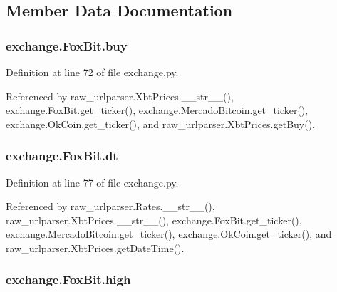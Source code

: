 \subsection{Member Data Documentation}
\hypertarget{classexchange_1_1_fox_bit_acb7e709cc05e8314b1bdacd32e4dfc80}{
\subsubsection[{buy}]{\setlength{\rightskip}{0pt plus 5cm}exchange.\-Fox\-Bit.\-buy}}\label{classexchange_1_1_fox_bit_acb7e709cc05e8314b1bdacd32e4dfc80}


Definition at line 72 of file exchange.\-py.



Referenced by raw\-\_\-urlparser.\-Xbt\-Prices.\-\_\-\-\_\-str\-\_\-\-\_\-(), exchange.\-Fox\-Bit.\-get\-\_\-ticker(), exchange.\-Mercado\-Bitcoin.\-get\-\_\-ticker(), exchange.\-Ok\-Coin.\-get\-\_\-ticker(), and raw\-\_\-urlparser.\-Xbt\-Prices.\-get\-Buy().

\hypertarget{classexchange_1_1_fox_bit_a363f8488eb0423f88519c085ae6f168f}{
\subsubsection[{dt}]{\setlength{\rightskip}{0pt plus 5cm}exchange.\-Fox\-Bit.\-dt}}\label{classexchange_1_1_fox_bit_a363f8488eb0423f88519c085ae6f168f}


Definition at line 77 of file exchange.\-py.



Referenced by raw\-\_\-urlparser.\-Rates.\-\_\-\-\_\-str\-\_\-\-\_\-(), raw\-\_\-urlparser.\-Xbt\-Prices.\-\_\-\-\_\-str\-\_\-\-\_\-(), exchange.\-Fox\-Bit.\-get\-\_\-ticker(), exchange.\-Mercado\-Bitcoin.\-get\-\_\-ticker(), exchange.\-Ok\-Coin.\-get\-\_\-ticker(), and raw\-\_\-urlparser.\-Xbt\-Prices.\-get\-Date\-Time().

\hypertarget{classexchange_1_1_fox_bit_a4f6dfaecbcc17ceadddf52d266d9c00d}{
\subsubsection[{high}]{\setlength{\rightskip}{0pt plus 5cm}exchange.\-Fox\-Bit.\-high}}\label{classexchange_1_1_fox_bit_a4f6dfaecbcc17ceadddf52d266d9c00d}


